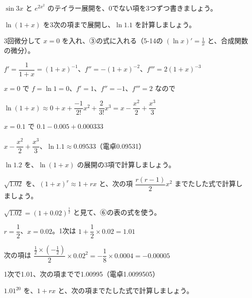\begin{jibun}
$\sin3x$ と $e^{2x^2}$ のテイラー展開を、0でない項を3つずつ書きましょう。
\end{jibun}

\begin{reidai}[$\ln(1+x)$ の展開]
$\ln(1+x)$ を3次の項まで展開し、$\ln1.1$ を計算しましょう。\par
\kangaekata 3回微分して $x=0$ を入れ、③の式に入れる（5-14の $(\ln x)'=\frac{1}{x}$ と、合成関数の微分）。\par
\shiki $f'=\dfrac{1}{1+x}=(1+x)^{-1}$、$f''=-(1+x)^{-2}$、$f'''=2(1+x)^{-3}$\par
\hspace*{2.6\zw}$x=0$ で $f=\ln1=0$、$f'=1$、$f''=-1$、$f'''=2$ なので\par
\hspace*{2.6\zw}$\ln(1+x)\approx0+x+\dfrac{-1}{2!}x^2+\dfrac{2}{3!}x^3=x-\dfrac{x^2}{2}+\dfrac{x^3}{3}$\par
\hspace*{2.6\zw}$x=0.1$ で $0.1-0.005+0.000333$\par
\kotae $x-\dfrac{x^2}{2}+\dfrac{x^3}{3}$、$\ln1.1\approx0.09533$（電卓0.09531）
\end{reidai}

\begin{jibun}
$\ln1.2$ を、$\ln(1+x)$ の展開の3項で計算しましょう。
\end{jibun}

\begin{reidai}
$\sqrt{1.02}$ を、$(1+x)^r\approx1+rx$ と、次の項 $\dfrac{r(r-1)}{2}x^2$ までたした式で計算しましょう。\par
\kangaekata $\sqrt{1.02}=(1+0.02)^{\frac{1}{2}}$ と見て、⑥の表の式を使う。\par
\shiki $r=\dfrac{1}{2}$、$x=0.02$。1次は $1+\dfrac{1}{2}\times0.02=1.01$\par
\hspace*{2.6\zw}次の項は $\dfrac{\frac{1}{2}\times(-\frac{1}{2})}{2}\times0.02^2=-\dfrac{1}{8}\times0.0004=-0.00005$\par
\kotae 1次で1.01、次の項までで1.00995（電卓1.0099505）
\end{reidai}

\begin{jibun}
$1.01^{20}$ を、$1+rx$ と、次の項までたした式で計算しましょう。
\end{jibun}

